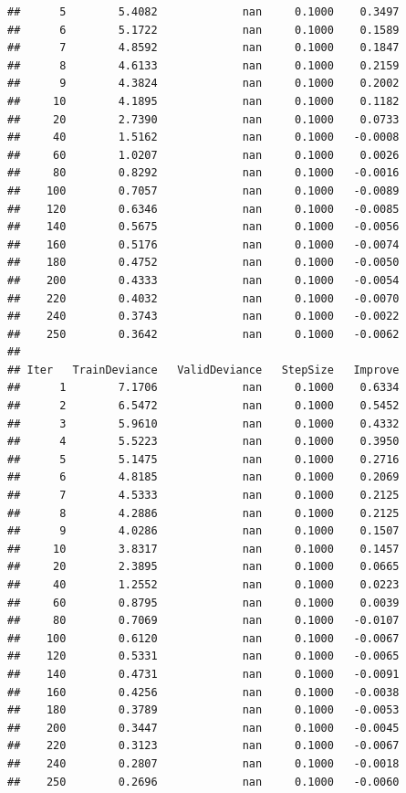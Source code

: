 \documentclass[
]{book}
\begin{document}
\begin{verbatim}
##      5        5.4082             nan     0.1000    0.3497
##      6        5.1722             nan     0.1000    0.1589
##      7        4.8592             nan     0.1000    0.1847
##      8        4.6133             nan     0.1000    0.2159
##      9        4.3824             nan     0.1000    0.2002
##     10        4.1895             nan     0.1000    0.1182
##     20        2.7390             nan     0.1000    0.0733
##     40        1.5162             nan     0.1000   -0.0008
##     60        1.0207             nan     0.1000    0.0026
##     80        0.8292             nan     0.1000   -0.0016
##    100        0.7057             nan     0.1000   -0.0089
##    120        0.6346             nan     0.1000   -0.0085
##    140        0.5675             nan     0.1000   -0.0056
##    160        0.5176             nan     0.1000   -0.0074
##    180        0.4752             nan     0.1000   -0.0050
##    200        0.4333             nan     0.1000   -0.0054
##    220        0.4032             nan     0.1000   -0.0070
##    240        0.3743             nan     0.1000   -0.0022
##    250        0.3642             nan     0.1000   -0.0062
## 
## Iter   TrainDeviance   ValidDeviance   StepSize   Improve
##      1        7.1706             nan     0.1000    0.6334
##      2        6.5472             nan     0.1000    0.5452
##      3        5.9610             nan     0.1000    0.4332
##      4        5.5223             nan     0.1000    0.3950
##      5        5.1475             nan     0.1000    0.2716
##      6        4.8185             nan     0.1000    0.2069
##      7        4.5333             nan     0.1000    0.2125
##      8        4.2886             nan     0.1000    0.2125
##      9        4.0286             nan     0.1000    0.1507
##     10        3.8317             nan     0.1000    0.1457
##     20        2.3895             nan     0.1000    0.0665
##     40        1.2552             nan     0.1000    0.0223
##     60        0.8795             nan     0.1000    0.0039
##     80        0.7069             nan     0.1000   -0.0107
##    100        0.6120             nan     0.1000   -0.0067
##    120        0.5331             nan     0.1000   -0.0065
##    140        0.4731             nan     0.1000   -0.0091
##    160        0.4256             nan     0.1000   -0.0038
##    180        0.3789             nan     0.1000   -0.0053
##    200        0.3447             nan     0.1000   -0.0045
##    220        0.3123             nan     0.1000   -0.0067
##    240        0.2807             nan     0.1000   -0.0018
##    250        0.2696             nan     0.1000   -0.0060

\end{verbatim}
\end{document}
